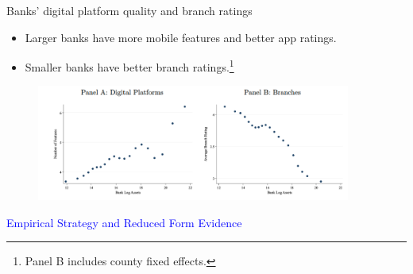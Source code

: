 \documentclass[notes,10pt, aspectratio=169]{beamer}
\begin{document}
\begin{frame}{Banks' digital platform quality and branch ratings}

    \begin{itemize}
        \item Larger banks have more mobile features and better app ratings. 
        \item Smaller banks have better branch ratings.\footnote{Panel B includes county fixed effects.}
    \end{itemize}
    \begin{figure}
        \centering
        \includegraphics[width=0.92\textwidth]{imgs/fig3.png}
        \label{fig:my_label}
    \end{figure}
    
    \end{frame}


\begin{frame}[noframenumbering]

    \huge \centering \textcolor{blue}{Empirical Strategy and Reduced Form Evidence}
\end{frame}
\end{document}
